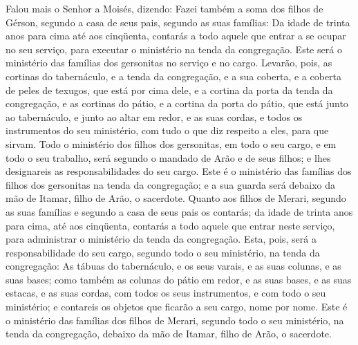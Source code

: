 Falou mais o Senhor a Moisés, dizendo: Fazei também a soma
dos filhos de Gérson, segundo a casa de seus pais, segundo as suas
famílias: Da idade de trinta anos para cima até aos
cinqüenta, contarás a todo aquele que entrar a se ocupar no seu
serviço, para executar o ministério na tenda da congregação.
Este será o ministério das famílias dos gersonitas no serviço
e no cargo. Levarão, pois, as cortinas do tabernáculo, e a
tenda da congregação, e a sua coberta, e a coberta de peles de
texugos, que está por cima dele, e a cortina da porta da tenda da
congregação, e as cortinas do pátio, e a cortina da porta do
pátio, que está junto ao tabernáculo, e junto ao altar em redor, e
as suas cordas, e todos os instrumentos do seu ministério, com tudo
o que diz respeito a eles, para que sirvam. Todo o ministério
dos filhos dos gersonitas, em todo o seu cargo, e em todo o seu
trabalho, será segundo o mandado de Arão e de seus filhos; e lhes
designareis as responsabilidades do seu cargo. Este é o
ministério das famílias dos filhos dos gersonitas na tenda da
congregação; e a sua guarda será debaixo da mão de Itamar, filho de
Arão, o sacerdote. Quanto aos filhos de Merari, segundo as
suas famílias e segundo a casa de seus pais os contarás; da
idade de trinta anos para cima, até aos cinqüenta, contarás a todo
aquele que entrar neste serviço, para administrar o ministério da
tenda da congregação. Esta, pois, será a responsabilidade do
seu cargo, segundo todo o seu ministério, na tenda da congregação:
As tábuas do tabernáculo, e os seus varais, e as suas colunas, e as
suas bases; como também as colunas do pátio em redor, e as
suas bases, e as suas estacas, e as suas cordas, com todos os seus
instrumentos, e com todo o seu ministério; e contareis os objetos
que ficarão a seu cargo, nome por nome. Este é o ministério
das famílias dos filhos de Merari, segundo todo o seu ministério, na
tenda da congregação, debaixo da mão de Itamar, filho de Arão, o
sacerdote.

